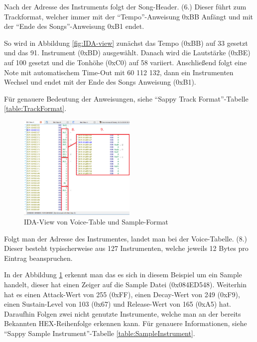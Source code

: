\documentclass[11pt,a4paper]{scrartcl}
\begin{document}
Nach der Adresse des Instruments folgt der Song-Header. (6.) Dieser f\"uhrt zum Trackformat, welcher immer mit der \enquote{Tempo}-Anweisung 0xBB Anf\"angt und mit der \enquote{Ende des Songs}-Anweisung 0xB1 endet. 

So wird in Abbildung \ref{fig:IDA-view} zun\"achst das Tempo (0xBB) auf 33 gesetzt und das 91. Instrument (0xBD) ausgew\"ahlt. Danach wird die Lautst\"arke (0xBE) auf 100 gesetzt und die Tonh\"ohe (0xC0) auf 58 variiert. Anschlie{\ss}end folgt eine Note mit automatischem Time-Out mit 60 112 132, dann ein Instrumenten Wechsel und endet mit der Ende des Songs Anweisung (0xB1). 

F\"ur genauere Bedeutung der Anweisungen, siehe \enquote{Sappy Track Format}-Tabelle \ref{table:TrackFormat}.

\newpage 

\begin{figure}
	\vspace{-10pt}
	\begin{center}
		\includegraphics[width=0.5\textwidth]{Sampleformat}
	\end{center}
	\vspace{-10pt}
	\caption{IDA-View von Voice-Table und Sample-Format}
	\label{fig:Sampleformat}
	\vspace{-30pt}
\end{figure}

Folgt man der Adresse des Instrumentes, landet man bei der Voice-Tabelle. (8.) Dieser besteht typischerweise aus 127 Instrumenten, welche jeweils 12 Bytes pro Eintrag beanspruchen.

In der Abbildung \ref{fig:Sampleformat} erkennt man das es sich in diesem Beispiel um ein Sample handelt, dieser hat einen Zeiger auf die Sample Datei (0x084ED548). Weiterhin hat es einen Attack-Wert von 255 (0xFF), einen Decay-Wert von 249 (0xF9), einen Sustain-Level von 103 (0x67) und Release-Wert von 165 (0xA5) hat. Daraufhin Folgen zwei nicht genutzte Instrumente, welche man an der bereits Bekannten HEX-Reihenfolge erkennen kann.
F\"ur genauere Informationen, siehe "`Sappy Sample Instrument"'-Tabelle \ref{table:SampleInstrument}.
\end{document}
